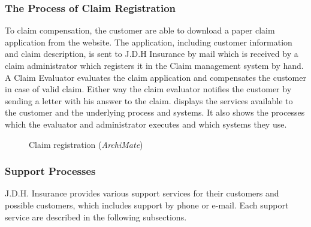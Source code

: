 \subsubsection{The Process of Claim Registration}
\label{sec:claim}
To claim compensation, the customer are able to download a paper claim application from the website. The application, including customer information and claim description, is sent to J.D.H Insurance by mail which is received by a claim administrator which registers it in the Claim management system by hand. A Claim Evaluator evaluates the claim application and compensates the customer in case of valid claim. Either way the claim evaluator notifies the customer by sending a letter with his answer to the claim.  displays the services available to the customer and the underlying process and systems. It also shows the processes which the evaluator and administrator executes and which systems they use.
\begin{center}
	\begin{figure}[H]
		\centering
		\setlength\fboxsep{7pt}
		\setlength\fboxrule{0.5pt}
		\caption{Claim registration (\emph{ArchiMate})}
		\label{fig:archi_claim}
	\end{figure}
\end{center}
%
\subsubsection{Support Processes}
\label{sec:support_processes}
J.D.H. Insurance provides various support services for their customers and possible customers, which includes support by phone or e-mail. Each support service are described in the following subsections.
